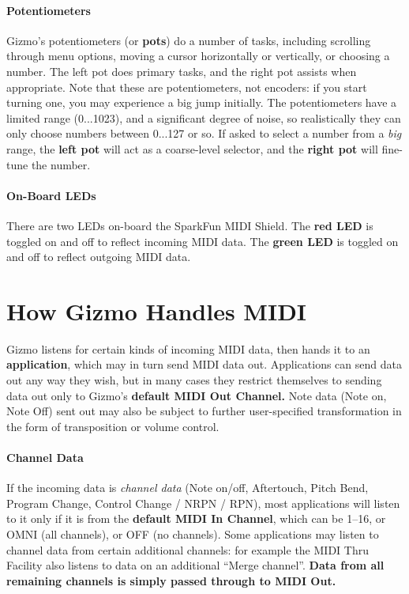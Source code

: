 \documentclass{article}
\begin{document}
\paragraph{Potentiometers}

Gizmo's potentiometers (or {\bf pots}) do a number of tasks, including scrolling through menu options, moving a cursor horizontally or vertically, or choosing a number.  The left pot does primary tasks, and the right pot assists when appropriate.  Note that these are potentiometers, not encoders: if you start turning one, you may experience a big jump initially.  The potentiometers have a limited range (0...1023), and a significant degree of noise, so realistically they can only choose numbers between 0...127 or so.  If asked to select a number from a {\it big} range, the {\bf left pot} will act as a coarse-level selector, and the {\bf right pot} will fine-tune the number.


\paragraph{On-Board LEDs}

There are two LEDs on-board the SparkFun MIDI Shield.  The {\bf red LED} is toggled on and off to reflect incoming MIDI data.  The {\bf green LED} is toggled on and off to reflect outgoing MIDI data.  

\clearpage
\section{How Gizmo Handles MIDI}

Gizmo listens for certain kinds of incoming MIDI data, then hands it to an {\bf application}, which may in turn send MIDI data out.  Applications can send data out any way they wish, but in many cases they restrict themselves to sending data out only to Gizmo's {\bf default MIDI Out Channel.}  Note data (Note on, Note Off) sent out may also be subject to further user-specified transformation in the form of transposition or volume control.  

\vspace{-0.5em}\paragraph{Channel Data} If the incoming data is {\it channel data} (Note on/off, Aftertouch, Pitch Bend, Program Change, Control Change / NRPN / RPN), most applications will listen to it only if it is from the {\bf default MIDI In Channel}, which can be 1--16, or OMNI (all channels), or OFF (no channels).  Some applications may listen to channel data from certain additional channels: for example the MIDI Thru Facility also listens to data on an additional ``Merge channel''.  {\bf Data from all remaining channels is simply passed through to MIDI Out. }  
\end{document}

